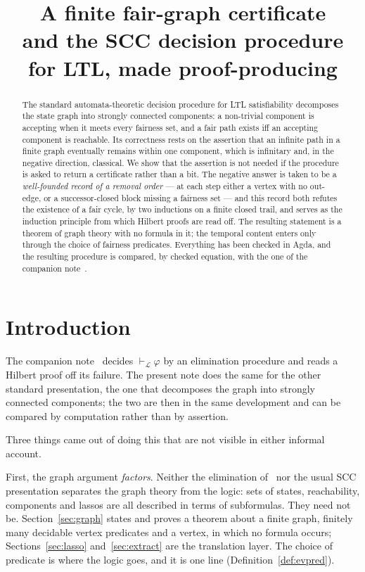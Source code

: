 \documentclass[11pt,a4paper]{article}
\title{A finite fair-graph certificate\\
{\large and the SCC decision procedure for LTL, made proof-producing}}
\author{}
\date{}
\theoremstyle{definition}
\newcommand{\proves}{\vdash_{\mathcal{L}}}
\begin{document}
\maketitle

\begin{abstract}
The standard automata-theoretic decision procedure for LTL satisfiability
decomposes the state graph into strongly connected components: a non-trivial
component is accepting when it meets every fairness set, and a fair path exists
iff an accepting component is reachable.  Its correctness rests on the
assertion that an infinite path in a finite graph eventually remains within one
component, which is infinitary and, in the negative direction, classical.  We
show that the assertion is not needed if the procedure is asked to return a
certificate rather than a bit.  The negative answer is taken to be a
\emph{well-founded record of a removal order} --- at each step either a vertex
with no out-edge, or a successor-closed block missing a fairness set --- and
this record both refutes the existence of a fair cycle, by two inductions on a
finite closed trail, and serves as the induction principle from which Hilbert
proofs are read off.  The resulting statement is a theorem of graph theory with
no formula in it; the temporal content enters only through the choice of
fairness predicates.  Everything has been checked in Agda, and the resulting
procedure is compared, by checked equation, with the one of the companion
note~\cite{m4}.
\end{abstract}

\section*{Introduction}

The companion note~\cite{m4} decides $\proves\varphi$ by an elimination
procedure and reads a Hilbert proof off its failure.  The present note does the
same for the other standard presentation, the one that decomposes the graph
into strongly connected components; the two are then in the same development
and can be compared by computation rather than by assertion.

Three things came out of doing this that are not visible in either informal
account.

First, the graph argument \emph{factors}.  Neither the elimination of~\cite{m4}
nor the usual SCC presentation separates the graph theory from the logic: sets
of states, reachability, components and lassos are all described in terms of
subformulas.  They need not be.  Section~\ref{sec:graph} states and proves a
theorem about a finite graph, finitely many decidable vertex predicates and a
vertex, in which no formula occurs; Sections~\ref{sec:lasso}
and~\ref{sec:extract} are the translation layer.  The choice of predicate is
where the logic goes, and it is one line (Definition~\ref{def:evpred}).
\end{document}
